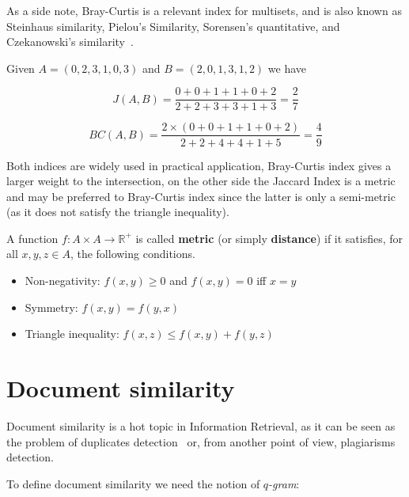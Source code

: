 As a side note, Bray-Curtis is a relevant index for multisets, and is also known as Steinhaus similarity, Pielou's Similarity, Sorensen's quantitative, and Czekanowski's similarity~\cite{legendre1998numerical}.

\begin{esempio}
	Given $A = (0, 2, 3, 1, 0, 3) $ and $B = (2, 0, 1, 3, 1, 2)$ we have
	
	\begin{equation}
	J(A,B) = \frac{0 + 0 + 1 + 1 + 0 + 2}{2 + 2 + 3 + 3 + 1 + 3} = \frac{2}{7} 
	\end{equation}
	
	\begin{equation}
	BC(A,B) = \frac{2 \times (0 + 0 + 1 + 1 + 0 + 2) }{2 + 2 + 4 + 4 + 1 + 5} = \frac{4}{9}
	\end{equation}
\end{esempio}

Both indices are widely used in practical application, Bray-Curtis index gives a larger weight to the intersection, on the other side the Jaccard Index is a metric and may be preferred to Bray-Curtis index since the latter is only a semi-metric (as it does not satisfy the triangle inequality). 

\begin{definizione}
	A function $f : A \times A \rightarrow \mathbb{R}^{+} $ is called \textbf{metric} (or simply \textbf{distance}) if it satisfies, for all $x, y, z \in A$, the following conditions.
	\begin{itemize}
		\item Non-negativity: $f(x,y) \geq 0$ and $f(x,y) = 0$ iff $x = y$
		\item Symmetry: $f(x, y) = f(y, x)$
		\item Triangle inequality: $f(x, z) \leq f(x, y) + f(y, z)$
	\end{itemize}
\end{definizione}

\section{Document similarity}

Document similarity is a hot topic in Information Retrieval, as it can be seen as the problem of duplicates detection~\cite{Broder2000} or, from another point of view, plagiarisms detection.\bigskip

To define document similarity we need the notion of \textit{$q$-gram}:

